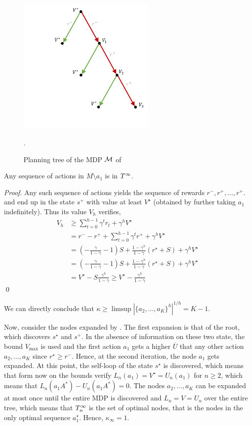 \documentclass[runningheads]{llncs}
\begin{document}
\begin{figure}
    \centering
    \includegraphics[trim={3.5cm 2cm 0.5cm 0.5cm}, clip, width=0.6\textwidth]{img/mdp_tree.pdf}
    \caption{Planning tree of the MDP $\mathcal{M}$ of }.
    \label{fig:mdp-tree}
\end{figure}
\begin{lemma}
 Any sequence of actions in $M\setminus{a_1}$ is in $T^\infty$.
\end{lemma}
\begin{proof}
Any such sequence of actions yields the sequence of rewards $r^-, r^+, \dots,r^+$. and end up in the state $s^+$ with value at least $V^\star$ (obtained by further taking $a_1$ indefinitely). Thus its value $V_h$ verifies, 
\begin{align*}
    V_h &\geq \sum_{t=0}^{h-1} \gamma^t r_t + \gamma^h V^\star\\
    &= r^- - r^+ + \sum_{t=0}^{h-1} \gamma^t r^+ + \gamma^h V^\star \\
    &= (-\frac{\gamma}{1-\gamma} - 1)S + \frac{1-\gamma^h}{1-\gamma} (r^\star + S) + \gamma^h V^\star\\
    &= (-\frac{\gamma}{1-\gamma} - 1)S + \frac{1-\gamma^h}{1-\gamma} (r^\star + S) + \gamma^h V^\star\\
    &= V^\star - S\frac{\gamma^h}{1-\gamma} \geq V^\star - \frac{\gamma^h}{1-\gamma}
\end{align*}
\qed\end{proof}

We can directly conclude that $\kappa \geq \limsup{|\{a_2,\dots,a_K\}^h|^{1/h}} = K-1$.

Now, consider the nodes expanded by . The first expansion is that of the root, which discovers $s^\star$ and $s^+$. In the absence of information on these two state, the bound $V_{\max}$ is used and the first action $a_1$ gets a higher $\overline{U}$ that any other action $a_2,\dots,a_K$ since $r^\star \geq r^-$. Hence, at the second iteration, the node $a_1$ gets expanded. At this point, the self-loop of the state $s^\star$ is discovered, which means that form now on the bounds verify $L_n(a_1) = V^\star = U_n(a_1)$ for $n\geq2$, which means that $L_n(a_1A^*)-U_n(a_1A^*) = 0$. The nodes $a_2,\dots,a_K$ can be expanded at most once until the entire MDP is discovered and $L_n=V=U_n$ over the entire tree, which means that $T_n^\infty$ is the set of optimal nodes, that is the nodes in the only optimal sequence $a_1^\star$. Hence, $\kappa_\infty = 1.$ 
\end{document}
